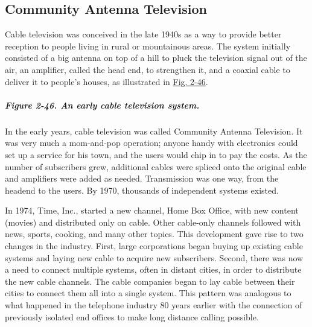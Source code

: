 \protect\hypertarget{0130661023_ch02lev1sec7.htmlux5cux23ch02lev2sec25}{}{}

\subsection{Community Antenna Television}

Cable television was conceived in the late 1940s as a way to provide
better reception to people living in rural or mountainous areas. The
system initially consisted of a big antenna on top of a hill to pluck
the television signal out of the air, an amplifier, called the {head
end}, to strengthen it, and a coaxial cable to deliver it to people's
houses, as illustrated in
\protect\hyperlink{0130661023_ch02lev1sec7.htmlux5cux23ch02fig46}{Fig.
2-46}.

\subparagraph[Figure 2-46. An early cable television
system.]{\texorpdfstring{\protect\hypertarget{0130661023_ch02lev1sec7.htmlux5cux23ch02fig46}{}{}Figure
2-46. An early cable television
system.}{Figure 2-46. An early cable television system.}}


In the early years, cable television was called {Community Antenna
Television}. It was very much a mom-and-pop operation; anyone handy with
electronics could set up a service for his town, and the users would
chip in to pay the costs. As the number of subscribers grew, additional
cables were spliced onto the original cable and amplifiers were added as
needed. Transmission was one way, from the headend to the users. By
1970, thousands of independent systems existed.

In 1974, Time, Inc., started a new channel, Home Box Office, with new
content (movies) and distributed only on cable. Other cable-only
channels followed with news, sports, cooking, and many other topics.
This development gave rise to two changes in the industry. First, large
corporations began buying up existing cable systems and laying new cable
to acquire new subscribers. Second, there was now a need to connect
multiple systems, often in distant cities, in order to distribute the
new cable channels. The cable companies began to lay cable between their
cities to connect them all into a single system. This pattern was
analogous to what happened in the telephone industry 80 years earlier
with the connection of previously isolated end offices to make long
distance calling possible.

\protect\hypertarget{0130661023_ch02lev1sec7.htmlux5cux23ch02lev2sec26}{}{}

